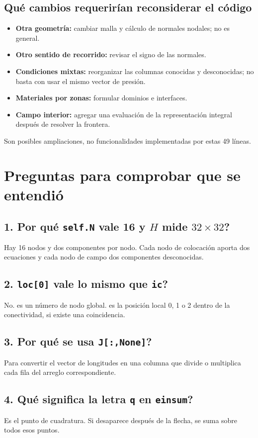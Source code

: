\documentclass[11pt,a4paper]{article}
\numberwithin{equation}{section}
\DeclareRobustCommand{\code}[1]{\texttt{\detokenize{#1}}}
\begin{document}
\subsection{Qu\'e cambios requerir\'ian reconsiderar el c\'odigo}
\begin{itemize}
 \item \textbf{Otra geometr\'ia:} cambiar malla y c\'alculo de normales
 nodales; \code{nodes/R} no es general.
 \item \textbf{Otro sentido de recorrido:} revisar el signo de las normales.
 \item \textbf{Condiciones mixtas:} reorganizar las columnas conocidas y
 desconocidas; no basta con usar el mismo vector de presi\'on.
 \item \textbf{Materiales por zonas:} formular dominios e interfaces.
 \item \textbf{Campo interior:} agregar una evaluaci\'on de la representaci\'on
 integral despu\'es de resolver la frontera.
\end{itemize}
Son posibles ampliaciones, no funcionalidades implementadas por
estas 49 l\'ineas.

\section{Preguntas para comprobar que se entendi\'o}
\subsection*{1. Por qu\'e \texttt{self.N} vale 16 y $H$ mide $32\times32$?}
Hay 16 nodos y dos componentes por nodo. Cada nodo de colocaci\'on
aporta dos ecuaciones y cada nodo de campo dos componentes desconocidas.

\subsection*{2. \texttt{loc[0]} vale lo mismo que \texttt{ic}?}
No. \code{ic} es un n\'umero de nodo global.
\code{loc[0]} es la posici\'on local 0, 1 o 2 dentro de la conectividad,
si existe una coincidencia.

\subsection*{3. Por qu\'e se usa \texttt{J[:,None]}?}
Para convertir el vector de longitudes en una columna que divide
o multiplica cada fila del arreglo correspondiente.

\subsection*{4. Qu\'e significa la letra \texttt{q} en \texttt{einsum}?}
Es el punto de cuadratura. Si desaparece despu\'es de la flecha,
se suma sobre todos esos puntos.
\end{document}
